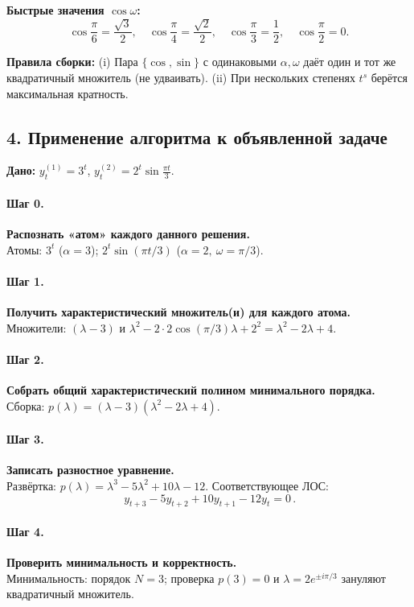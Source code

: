 \textbf{Быстрые значения \(\cos\omega\):}
\[
\cos\frac{\pi}{6}=\frac{\sqrt3}{2},\quad
\cos\frac{\pi}{4}=\frac{\sqrt2}{2},\quad
\cos\frac{\pi}{3}=\frac12,\quad
\cos\frac{\pi}{2}=0.
\]

\textbf{Правила сборки:} (i) Пара \(\{\cos,\sin\}\) с одинаковыми \(\alpha,\omega\) даёт один и тот же квадратичный множитель (не удваивать). (ii) При нескольких степенях \(t^{s}\) берётся максимальная кратность.

\subsection*{4. Применение алгоритма к объявленной задаче}

\textbf{Дано:} \(y^{(1)}_t=3^{t}\), \(y^{(2)}_t=2^{t}\sin\!\frac{\pi t}{3}\).

\paragraph{Шаг 0.} \textbf{Распознать «атом» каждого данного решения.}\\
Атомы: \(3^t\) (\(\alpha=3\)); \(2^t\sin(\pi t/3)\) (\(\alpha=2,\ \omega=\pi/3\)).

\paragraph{Шаг 1.} \textbf{Получить характеристический множитель(и) для каждого атома.}\\
Множители: \((\lambda-3)\) и \(\lambda^2-2\cdot 2\cos(\pi/3)\lambda+2^2=\lambda^2-2\lambda+4\).

\paragraph{Шаг 2.} \textbf{Собрать общий характеристический полином минимального порядка.}\\
Сборка: \(p(\lambda)=(\lambda-3)(\lambda^2-2\lambda+4)\).

\paragraph{Шаг 3.} \textbf{Записать разностное уравнение.}\\
Развёртка: \(p(\lambda)=\lambda^3-5\lambda^2+10\lambda-12\).
Соответствующее ЛОС:
\[
\boxed{\,y_{t+3}-5y_{t+2}+10y_{t+1}-12y_t=0\,}.
\]

\paragraph{Шаг 4.} \textbf{Проверить минимальность и корректность.}\\
Минимальность: порядок \(N=3\); проверка \(p(3)=0\) и \(\lambda=2e^{\pm i\pi/3}\) зануляют квадратичный множитель.
